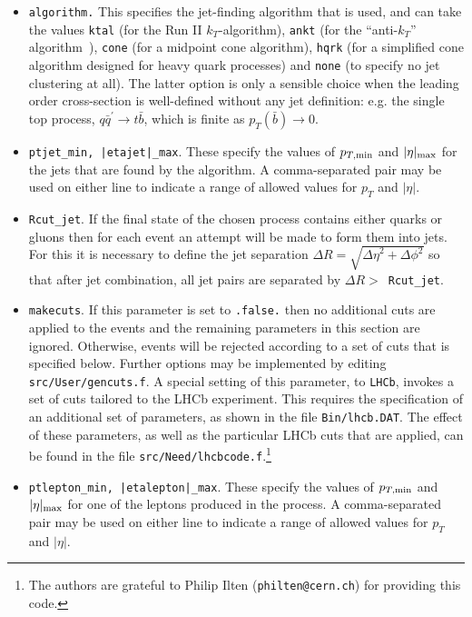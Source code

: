 \documentclass{article}
\begin{document}
\begin{itemize}
\item {\tt algorithm.} This specifies the jet-finding algorithm that
is used, and can take the values
{\tt ktal} (for the Run II $k_T$-algorithm), {\tt ankt} (for the
``anti-$k_T$'' algorithm~\cite{Cacciari:2008gp}), {\tt cone} (for
a midpoint cone algorithm), {\tt hqrk} (for a simplified cone
algorithm designed for heavy quark processes) and {\tt none} (to
specify no jet clustering at all). The latter option is only a
sensible choice when the leading order cross-section is well-defined
without any jet definition: e.g. the single top process,
$q{\bar q^\prime} \to t{\bar b}$, which is finite as
$p_T({\bar b}) \to 0$.

\item {\tt ptjet\_min, |etajet|\_max}. These specify the values
of $p_{T,{\rm min}}$ and $|\eta|_{\rm max}$ for the
jets that are found by the algorithm.  A comma-separated pair
may be used on either line to indicate a range of allowed values for
$p_T$ and $|\eta|$.

\item {\tt Rcut\_jet}. If the final state of the chosen process contains
either quarks or gluons then for each event an attempt will be made
to form them into jets. For this it is necessary to define the
jet separation $\Delta R=\sqrt{{\Delta \eta}^2 + {\Delta \phi}^2}$
so that after jet combination, all jet pairs are separated by
$\Delta R >$~{\tt Rcut\_jet}.

\item {\tt makecuts}. If this parameter is set to {\tt .false.} then
no additional cuts are applied to the events and the remaining
parameters in this section are ignored. Otherwise, events will
be rejected according to a set of cuts that is specified below.
Further options may be implemented by editing {\tt src/User/gencuts.f}.
A special setting of this parameter, to {\tt LHCb}, invokes a set of
cuts tailored to the LHCb experiment.  This requires the specification
of an additional set of parameters, as shown in the file {\tt Bin/lhcb.DAT}.
The effect of these parameters, as well as the particular LHCb cuts that
are applied, can be found in the file {\tt src/Need/lhcbcode.f}.\footnote{
The authors are grateful to Philip Ilten ({\tt philten@cern.ch}) for
providing this code.}

\item {\tt ptlepton\_min, |etalepton|\_max}. These specify the values
of $p_{T,{\rm min}}$ and $|\eta|_{\rm max}$ for one of the leptons produced
in the process.   A comma-separated pair
may be used on either line to indicate a range of allowed values for
$p_T$ and $|\eta|$.


\end{itemize}
\end{document}
